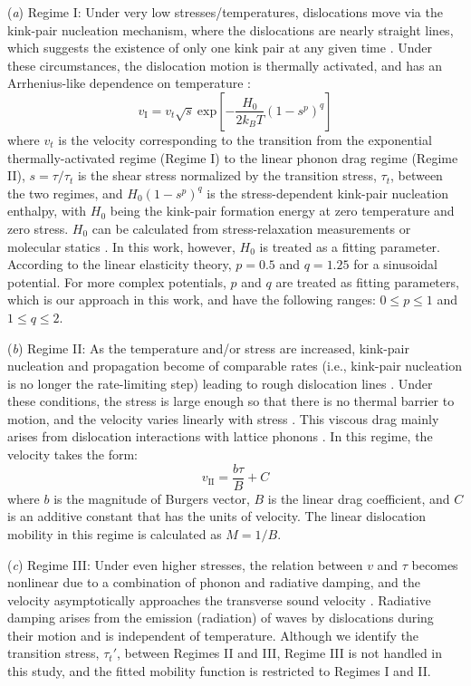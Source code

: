 \documentclass[applsci,article,submit,pdftex,moreauthors]{Definitions/mdpi}
\newcommand{\?}{\stackrel{?}{=}}
\begin{document}
(\textit{a}) Regime I: Under very low stresses/temperatures, dislocations move via the kink-pair nucleation mechanism, where the dislocations are nearly straight lines, which suggests the existence of only one kink pair at any given time \cite{Gilbert2011}. Under these circumstances, the dislocation motion is thermally activated, and has an Arrhenius-like dependence on temperature \cite{Gilbert2011, Starikov2020}:
\begin{equation}
v_\text{I} = v_t \sqrt{s} \ \mathrm{exp} \left[ - \frac{H_0}{2 k_B T} \left(1-s^p\right)^q \right]
\label{Eq:MobI}
\end{equation}
where $v_t$ is the velocity corresponding to the transition from the exponential thermally-activated regime (Regime I) to the linear phonon drag regime (Regime II), $s = \tau/\tau_t$ is the shear stress normalized by the transition stress, $\tau_t$, between the two regimes, and $H_0 \left(1-s^p\right)^q$ is the stress-dependent kink-pair nucleation enthalpy, with $H_0$ being the kink-pair formation energy at zero temperature and zero stress. $H_0$ can be calculated from stress-relaxation measurements or molecular statics \cite{Ventelon2009, Gilbert2011}. In this work, however, $H_0$ is treated as a fitting parameter. According to the linear elasticity theory, $p=0.5$ and $q=1.25$ for a sinusoidal potential. For more complex potentials, $p$ and $q$ are treated as fitting parameters, which is our approach in this work, and have the following ranges: $0 \leq p \leq 1$ and $1 \leq q \leq 2$.

(\textit{b}) Regime II: As the temperature and/or stress are increased, kink-pair nucleation and propagation become of comparable rates (i.e., kink-pair nucleation is no longer the rate-limiting step) leading to rough dislocation lines \cite{Gilbert2011}. Under these conditions, the stress is large enough so that there is no thermal barrier to motion, and the velocity varies linearly with stress \cite{Dang2019, Olmsted2005}. This viscous drag mainly arises from dislocation interactions with lattice phonons \cite{Dang2019}. In this regime, the velocity takes the form:
\begin{equation}
v_\text{II} = \frac{b \tau}{B} + C
\label{Eq:MobII}
\end{equation}
where $b$ is the magnitude of Burgers vector, $B$ is the linear drag coefficient, and $C$ is an additive constant that has the units of velocity. The linear dislocation mobility in this regime is calculated as $M = 1/B$.

(\textit{c}) Regime III: Under even higher stresses, the relation between $v$ and $\tau$ becomes nonlinear due to a combination of phonon and radiative damping, and the velocity asymptotically approaches the transverse sound velocity \cite{Dang2019}. Radiative damping arises from the emission (radiation) of waves by dislocations during their motion and is independent of temperature. Although we identify the transition stress, $\tau_t'$, between Regimes II and III, Regime III is not handled in this study, and the fitted mobility function is restricted to Regimes I and II.
\end{document}

